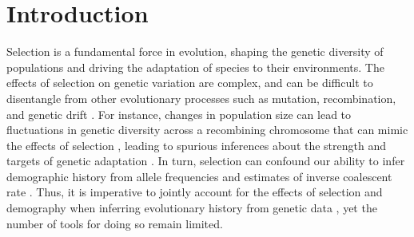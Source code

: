 \documentclass[hidelinks]{article}
\begin{document}
\section*{Introduction}
    \label{introduction}
    Selection is a fundamental force in evolution, shaping the
    genetic diversity of populations and driving the adaptation of
    species to their environments. The effects of selection
    on genetic variation are complex, and can be difficult to disentangle
    from other evolutionary processes such as mutation, recombination,
    and genetic drift \citep[e.g.,][]{ohta1973slightly,lewontin1973distribution, kimura1985neutral, tajima1989statistical,gillespie1991causes, kern2018neutral}. 
    For instance, changes in population size can lead to fluctuations
    in genetic diversity across a recombining chromosome
    that can mimic the effects of selection \citep{simonsen1995properties},
    leading to spurious inferences about the strength and targets of genetic adaptation
    \citep{simonsen1995properties,akey2004population,nielsen2005genomic}.
    In turn, selection can confound our ability to infer demographic
    history from allele frequencies \citep{ewing2016consequences,schrider2016effects} and
    estimates of inverse coalescent rate \citep{schrider2016effects, johri2021impact, cousins2024accurate}.
    Thus, it is imperative to jointly account for the effects of selection
    and demography when inferring evolutionary history from genetic data \citep[e.g.,][]{sheehan2016deep,johri2020toward},
    yet the number of tools for doing so remain limited.
\end{document}

